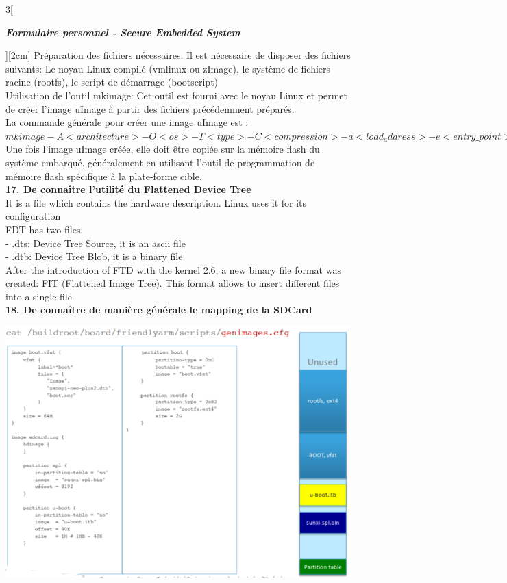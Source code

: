 \begin{multicols}{3}[\centerline{ \large\em \textbf{Formulaire personnel - Secure Embedded System}}][2cm]
Préparation des fichiers nécessaires: Il est nécessaire de disposer des fichiers suivants: Le noyau Linux compilé (vmlinux ou zImage), le système de fichiers racine (rootfs), le script de démarrage (bootscript)\\
Utilisation de l'outil mkimage: Cet outil est fourni avec le noyau Linux et permet de créer l'image uImage à partir des fichiers précédemment préparés. \\
La commande générale pour créer une image uImage est :\\
$mkimage -A <architecture> -O <os> -T <type> -C <compression> -a <load_address> -e <entry\_ point> -n <image\_name> -d <image\_file> <uImage\_file>$\\
Une fois l'image uImage créée, elle doit être copiée sur la mémoire flash du système embarqué, généralement en utilisant l'outil de programmation de mémoire flash spécifique à la plate-forme cible. 
\\ \textbf{17. De connaître l’utilité du Flattened Device Tree\\}
It is a file which contains the hardware description. Linux uses it for its configuration\\
FDT has two files:\\
- .dts: Device Tree Source, it is an ascii file\\
- .dtb: Device Tree Blob, it is a binary file\\
After the introduction of FTD with the kernel 2.6, a new binary file format was created: FIT (Flattened Image Tree).  This format allows to insert different files into a single file
\\ \textbf{18. De connaître de manière générale le mapping de la SDCard\\}
\begin{minipage}{\linewidth}
	\centering
    \includegraphics[width =0.6\columnwidth]{images/52.png}
\end{minipage}

\end{multicols}
